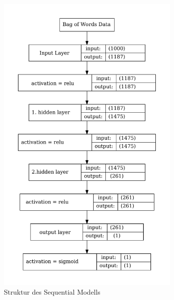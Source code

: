 \documentclass[aspectratio=1610, professionalfonts, 9pt]{beamer}
\begin{document}
\begin{frame}
\begin{columns}
\begin{figure}
          \includegraphics[width=0.8\textwidth]{pictures/bow/opt_model_bow2.pdf}
          \caption{Struktur des Sequential Modells}
          \label{}
      \end{figure}
      
    \end{columns}
  \end{frame}
\end{document}
